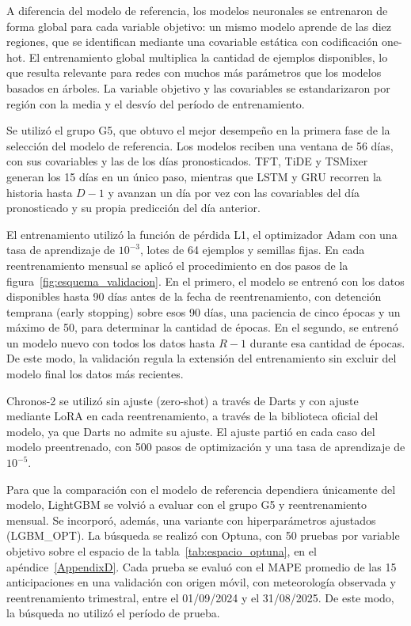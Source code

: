 A diferencia del modelo de referencia, los modelos neuronales se entrenaron de forma global para cada variable objetivo: un mismo modelo aprende de las diez regiones, que se identifican mediante una covariable estática con codificación one-hot. El entrenamiento global multiplica la cantidad de ejemplos disponibles, lo que resulta relevante para redes con muchos más parámetros que los modelos basados en árboles. La variable objetivo y las covariables se estandarizaron por región con la media y el desvío del período de entrenamiento.

Se utilizó el grupo G5, que obtuvo el mejor desempeño en la primera fase de la selección del modelo de referencia. Los modelos reciben una ventana de 56 días, con sus covariables y las de los días pronosticados. TFT, TiDE y TSMixer generan los 15 días en un único paso, mientras que LSTM y GRU recorren la historia hasta $D-1$ y avanzan un día por vez con las covariables del día pronosticado y su propia predicción del día anterior.

El entrenamiento utilizó la función de pérdida L1, el optimizador Adam con una tasa de aprendizaje de $10^{-3}$, lotes de 64 ejemplos y semillas fijas. En cada reentrenamiento mensual se aplicó el procedimiento en dos pasos de la figura~\ref{fig:esquema_validacion}. En el primero, el modelo se entrenó con los datos disponibles hasta 90 días antes de la fecha de reentrenamiento, con detención temprana (early stopping) sobre esos 90 días, una paciencia de cinco épocas y un máximo de 50, para determinar la cantidad de épocas. En el segundo, se entrenó un modelo nuevo con todos los datos hasta $R-1$ durante esa cantidad de épocas. De este modo, la validación regula la extensión del entrenamiento sin excluir del modelo final los datos más recientes.

Chronos-2 se utilizó sin ajuste (zero-shot) a través de Darts y con ajuste mediante LoRA en cada reentrenamiento, a través de la biblioteca oficial del modelo, ya que Darts no admite su ajuste. El ajuste partió en cada caso del modelo preentrenado, con 500 pasos de optimización y una tasa de aprendizaje de $10^{-5}$.

Para que la comparación con el modelo de referencia dependiera únicamente del modelo, LightGBM se volvió a evaluar con el grupo G5 y reentrenamiento mensual. Se incorporó, además, una variante con hiperparámetros ajustados (LGBM\_OPT). La búsqueda se realizó con Optuna, con 50 pruebas por variable objetivo sobre el espacio de la tabla~\ref{tab:espacio_optuna}, en el apéndice~\ref{AppendixD}. Cada prueba se evaluó con el MAPE promedio de las 15 anticipaciones en una validación con origen móvil, con meteorología observada y reentrenamiento trimestral, entre el 01/09/2024 y el 31/08/2025. De este modo, la búsqueda no utilizó el período de prueba.

